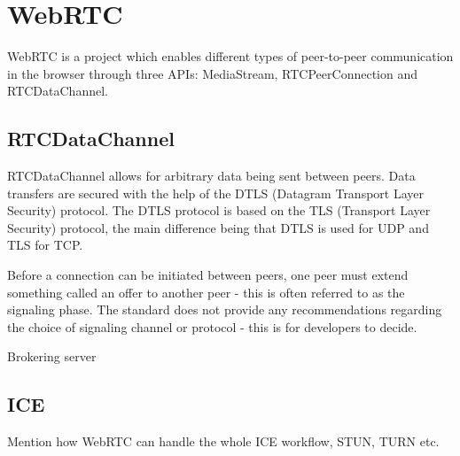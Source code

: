 \section{WebRTC}

WebRTC is a project which enables different types of peer-to-peer communication in the browser through three APIs: MediaStream, RTCPeerConnection and RTCDataChannel.

\subsection{RTCDataChannel}
RTCDataChannel allows for arbitrary data being sent between peers. Data transfers are secured with the help of the DTLS (Datagram Transport Layer Security) protocol. The DTLS protocol is based on the TLS (Transport Layer Security) protocol, the main difference being that DTLS is used for UDP and TLS for TCP.

Before a connection can be initiated between peers, one peer must extend something called an offer to another peer - this is often referred to as the signaling phase. The standard does not provide any recommendations regarding the choice of signaling channel or protocol - this is for developers to decide.

Brokering server

\subsection{ICE}
Mention how WebRTC can handle the whole ICE workflow, STUN, TURN etc.